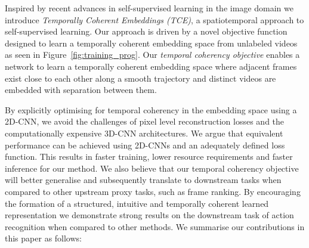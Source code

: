 \documentclass[a4paper,conference]{IEEEtran}
\begin{document}
Inspired by recent advances in self-supervised learning in the image domain \cite{bachman2019learning, chen2020simple} we introduce \textit{Temporally Coherent Embeddings (TCE)}, a spatiotemporal approach to self-supervised learning. Our approach is driven by a novel objective function designed to learn a temporally coherent embedding space from unlabeled videos as seen in Figure~\ref{fig:training_prog}. Our \textit{temporal coherency objective} enables a network to learn a temporally coherent embedding space where adjacent frames exist close to each other along a smooth trajectory and distinct videos are embedded with separation between them.



By explicitly optimising for temporal coherency in the embedding space using a 2D-CNN, we avoid the challenges of pixel level reconstruction losses and the computationally expensive 3D-CNN architectures. We argue that equivalent performance can be achieved using 2D-CNNs and an adequately defined loss function. This results in faster training, lower resource requirements and faster inference for our method. We also believe that our temporal coherency objective will better generalise and subsequently translate to downstream tasks when compared to other upstream proxy tasks, such as frame ranking. By encouraging the formation of a structured, intuitive and temporally coherent learned representation we demonstrate strong results on the downstream task of action recognition when compared to other methods.
We summarise our contributions in this paper as follows:
\end{document}
